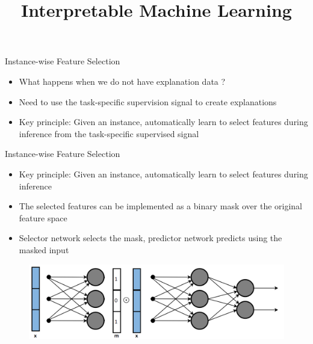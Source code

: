 \documentclass[11pt,compress,t,notes=noshow, aspectratio=169, xcolor=table]{beamer}
\title{Interpretable Machine Learning}
\date{}
\begin{document}
	\graphicspath{ {./figure/} }

\newcommand{\titlefigure}{figure/bild16}
\newcommand{\learninggoals}{
\item Optimization problems in hard-masking
\item Generative masking
\item Sampling based instance-wise feature selection}


 
\begin{frame}[c]{Instance-wise Feature Selection}
    \begin{itemize}
        \item What happens when we do not have explanation data ?
        \bigskip
        \item Need to use the task-specific supervision signal to create explanations
        \bigskip
        \item Key principle: Given an instance, automatically learn to select features during inference
from the task-specific supervised signal
    \end{itemize}
\end{frame}	
	
\begin{frame}{Instance-wise Feature Selection}
    \begin{itemize}
        \item Key principle: Given an instance, automatically learn to select features during inference
        \item The selected features can be implemented as a binary mask over the original feature
space
\item Selector network selects the mask, predictor network predicts using the masked input
    \end{itemize}
    \begin{figure}
        \centering
        \includegraphics[scale=.45]{bild16}
    \end{figure}
\end{frame}
	
\end{document}
